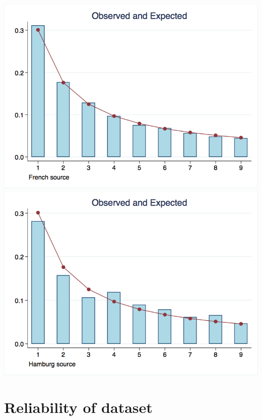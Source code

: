 \documentclass[12pt,a4paper,titlepage,english]{article}
\begin{document}
\begin{center}
\includegraphics[scale=.28]{benford_fr.png}
\includegraphics[scale=.28]{benford_hb.png}
\end{center}



\section{Reliability of dataset}
\end{document}
